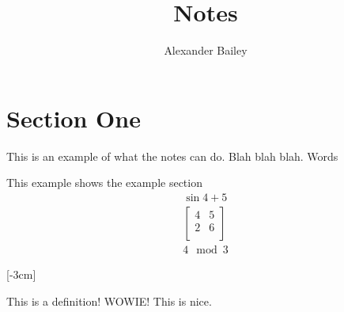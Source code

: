 \documentclass[12pt]{article}
\begin{document}
\title{Notes}
\author{Alexander Bailey}
\maketitle
\flushbottom
\newpage

\section{Section One}
This is an example of what the notes can do. Blah blah blah. Words

\begin{example}
  This example shows the example section 
  \begin{align*}
    \sin{4  + 5} \\
    \begin{bmatrix}
      4 & 5 \\
      2 & 6 \\
    \end{bmatrix}
    \\
    4 \mod 3 
  \end{align*}
\end{example}

[-3cm]
\begin{definition}
  This is a definition! WOWIE! This is nice. 
\end{definition}
\end{document}
